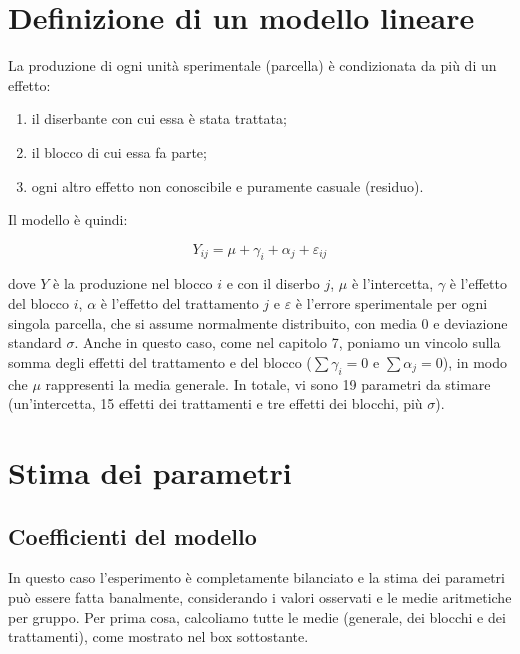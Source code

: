 \documentclass[a4paper,12pt,oneside]{book}
\providecommand{\tightlist}{%
  \setlength{\itemsep}{0pt}\setlength{\parskip}{0pt}}
\begin{document}
\normalsize

\hypertarget{definizione-di-un-modello-lineare-1}{%
\section{Definizione di un modello lineare}\label{definizione-di-un-modello-lineare-1}}

La produzione di ogni unità sperimentale (parcella) è condizionata da più di un effetto:

\begin{enumerate}
\def\labelenumi{\arabic{enumi}.}
\tightlist
\item
  il diserbante con cui essa è stata trattata;
\item
  il blocco di cui essa fa parte;
\item
  ogni altro effetto non conoscibile e puramente casuale (residuo).
\end{enumerate}

Il modello è quindi:

\[ Y_{ij} = \mu + \gamma_i + \alpha_j + \varepsilon_{ij}\]

dove \(Y\) è la produzione nel blocco \(i\) e con il diserbo \(j\), \(\mu\) è l'intercetta, \(\gamma\) è l'effetto del blocco \(i\), \(\alpha\) è l'effetto del trattamento \(j\) e \(\varepsilon\) è l'errore sperimentale per ogni singola parcella, che si assume normalmente distribuito, con media 0 e deviazione standard \(\sigma\). Anche in questo caso, come nel capitolo 7, poniamo un vincolo sulla somma degli effetti del trattamento e del blocco (\(\sum \gamma_i = 0\) e \(\sum \alpha_j = 0\)), in modo che \(\mu\) rappresenti la media generale. In totale, vi sono 19 parametri da stimare (un'intercetta, 15 effetti dei trattamenti e tre effetti dei blocchi, più \(\sigma\)).

\hypertarget{stima-dei-parametri-1}{%
\section{Stima dei parametri}\label{stima-dei-parametri-1}}

\hypertarget{coefficienti-del-modello}{%
\subsection{Coefficienti del modello}\label{coefficienti-del-modello}}

In questo caso l'esperimento è completamente bilanciato e la stima dei parametri può essere fatta banalmente, considerando i valori osservati e le medie aritmetiche per gruppo. Per prima cosa, calcoliamo tutte le medie (generale, dei blocchi e dei trattamenti), come mostrato nel box sottostante.
\end{document}
